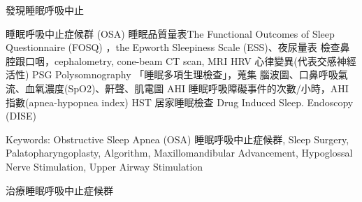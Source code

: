 \documentclass[aspectratio=169]{beamer}
\begin{document}
\begin{frame}{發現睡眠呼吸中止}

    \begin{outline}
    \1 睡眠呼吸中止症候群 (OSA)
    \2 睡眠品質量表The Functional Outcomes of Sleep Questionnaire (FOSQ) ，the Epworth Sleepiness Scale (ESS)、夜尿量表
    \2 檢查鼻腔跟口咽，cephalometry, cone-beam CT scan, MRI
    \2 HRV 心律變異(代表交感神經活性)
    \2 PSG Polysomnography 「睡眠多項生理檢查」，蒐集
        \3 腦波圖、口鼻呼吸氣流、血氧濃度(SpO2)、鼾聲、肌電圖
        \3 AHI  睡眠呼吸障礙事件的次數/小時，AHI指數(apnea-hypopnea index)
    \2 HST 居家睡眠檢查
    \2 Drug Induced Sleep. Endoscopy (DISE) 
    \end{outline}
Keywords: Obstructive Sleep Apnea (OSA)
睡眠呼吸中止症候群, Sleep Surgery, Palatopharyngoplasty, Algorithm, Maxillomandibular Advancement, Hypoglossal Nerve Stimulation, Upper Airway Stimulation \end{frame}


\begin{frame}{治療睡眠呼吸中止症候群}

\begin{adjustbox}{minipage=15cm, center}


\end{adjustbox}
\end{frame}
\end{document}
